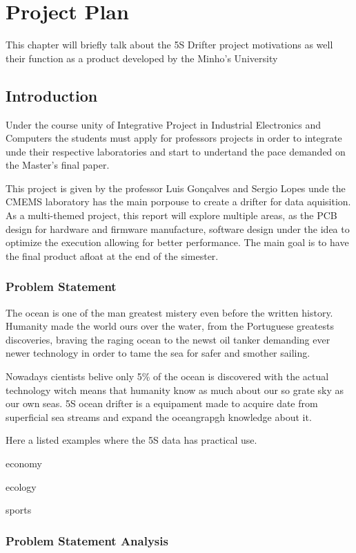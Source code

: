 \chapter{Project Plan}
    This chapter will briefly talk about the 5S Drifter project motivations as well their function as a product developed 
    by the Minho's University  
\section{Introduction}
Under the course unity of Integrative Project in Industrial Electronics and Computers the students must
apply for professors projects in order to integrate unde their respective laboratories and start to undertand the pace
demanded on the Master's final paper.

This project is given by the professor Luis Gonçalves and Sergio Lopes unde the CMEMS laboratory
has the main porpouse to create a drifter for data aquisition. As a multi-themed project, this report will
explore multiple areas, as the PCB design for hardware and firmware manufacture, software design under the idea to optimize
the execution allowing for better performance. The main goal is to have the final product afloat at the end of the simester.
\subsection{Problem Statement}
The ocean is one of the man greatest mistery even before the written history. Humanity made the world ours over the water, 
from the Portuguese greatests discoveries, braving the raging ocean to the newst oil tanker demanding ever newer technology
in order to tame the sea for safer and smother sailing.

Nowadays cientists belive only 5\% of the ocean is discovered with the actual technology witch means that humanity 
know as much about our so grate sky as our own seas. 5S ocean drifter is a equipament made to acquire date from 
superficial sea streams and expand the oceangrapgh knowledge about it.

Here a listed examples where the 5S data has practical use.

economy

ecology

sports
\subsection{Problem Statement Analysis}

